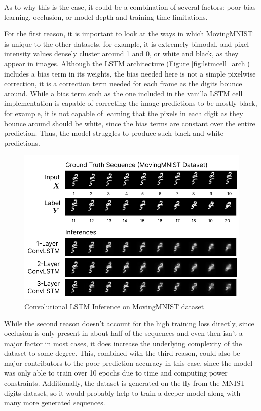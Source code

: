 \documentclass{scrartcl}
\begin{document}
As to why this is the case, it could be a combination of several factors: poor
bias learning, occlusion, or model depth and training time limitations. 

For the first reason, it is important to look at the ways in which MovingMNIST
is unique to the other datasets, for example, it is extremely bimodal, and
pixel intensity values densely cluster around 1 and 0, or white and black, as
they appear in images. Although the LSTM architecture (Figure \ref{fig:lstmcell_arch})
includes a bias term in its weights, the bias needed here is not a simple
pixelwise correction, it is a correction term needed for each frame as the
digits bounce around. While a bias term such as the one included in the vanilla
LSTM cell implementation is capable of correcting the image predictions to be
mostly black, for example, it is not capable of learning that the pixels in
each digit as they bounce around should be white, since the bias terms are
constant over the entire prediction. Thus, the model struggles to produce such
black-and-white predictions.

\begin{figure}[H]
	\begin{center}
		\includegraphics[width=1\textwidth]{inferences/mmnist/mmnist_inferences_1.png}
	\end{center}
	\caption{Convolutional LSTM Inference on MovingMNIST dataset}
	\label{inf:convlstm_mmnist_inference_1}
\end{figure}

While the second reason doesn't account for the high training loss directly,
since occlusion is only present in about half of the sequences and even then
isn't a major factor in most cases, it does increase the underlying complexity
of the dataset to some degree. This, combined with the third reason, could also
be major contributors to the poor prediction accuracy in this case, since the
model was only able to train over 10 epochs due to time and computing power
constraints. Additionally, the dataset is generated on the fly from the MNIST
digits dataset, so it would probably help to train a deeper model along with
many more generated sequences.
\end{document}
